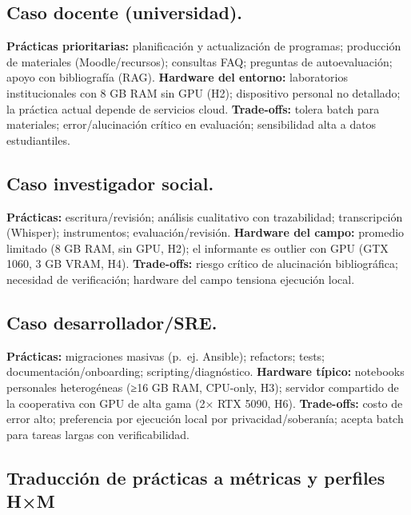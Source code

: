 \documentclass{llncs}
\begin{document}
\subsection{Caso docente (universidad).}\label{caso-docente-universidad.}

\textbf{Prácticas prioritarias:} planificación y actualización de
programas; producción de materiales (Moodle/recursos); consultas FAQ;
preguntas de autoevaluación; apoyo con bibliografía (RAG).
\textbf{Hardware del entorno:} laboratorios institucionales con 8 GB RAM sin GPU (H2); dispositivo personal no detallado; la práctica actual depende de servicios cloud.
\textbf{Trade-offs:} tolera batch para materiales; error/alucinación
crítico en evaluación; sensibilidad alta a datos estudiantiles.

\subsection{Caso investigador social.}\label{caso-investigador-social.}

\textbf{Prácticas:} escritura/revisión; análisis cualitativo con
trazabilidad; transcripción (Whisper); instrumentos;
evaluación/revisión.
\textbf{Hardware del campo:} promedio limitado (8 GB RAM, sin GPU, H2); el informante es outlier con GPU (GTX 1060, 3 GB VRAM, H4).
\textbf{Trade-offs:} riesgo crítico de alucinación
bibliográfica; necesidad de verificación; hardware del campo tensiona ejecución local.

\subsection{Caso desarrollador/SRE.}\label{caso-desarrolladorsre.}

\textbf{Prácticas:} migraciones masivas (p.~ej. Ansible); refactors;
tests; documentación/onboarding; scripting/diagnóstico.
\textbf{Hardware típico:} notebooks personales heterogéneas (≥16 GB RAM, CPU-only, H3); servidor compartido de la cooperativa con GPU de alta gama (2× RTX 5090, H6).
\textbf{Trade-offs:} costo de error alto; preferencia por ejecución
local por privacidad/soberanía; acepta batch para tareas largas con
verificabilidad.

\subsection{Traducción de prácticas a métricas y perfiles H×M}\label{traducciuxf3n-de-pruxe1cticas-a-muxe9tricas-y-perfiles-hm}
\end{document}
